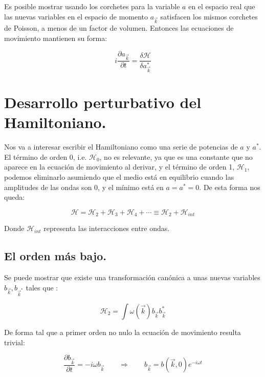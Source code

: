 Es posible mostrar usando los corchetes para la variable $a$ en el espacio real que las nuevas variables en el espacio de momento $a_{\vec k}$ satisfacen los mismos corchetes de Poisson, a menos de un factor de volumen. Entonces las ecuaciones de movimiento mantienen su forma:

\begin{equation}
	i\frac{\partial a_{\vec k}}{\partial t} = \frac{\delta \mathcal{H}}{\delta a_{\vec k}^*}
\end{equation}

\section{Desarrollo perturbativo del Hamiltoniano.}
Nos va a interesar escribir el Hamiltoniano como una serie de potencias de $a$ y $a^*$. El término de orden 0, i.e. $\mathcal{H}_0$, no es relevante, ya que es una constante que no aparece en la ecuación de movimiento al derivar, y el término de orden 1, $\mathcal{H}_1$, podemos eliminarlo asumiendo que el medio está en equilibrio cuando las amplitudes de las ondas son 0, y el mínimo está en $a=a^*=0$. De esta forma nos queda:

\begin{equation}
	\mathcal{H} = \mathcal{H}_2 + \mathcal{H}_3 + \mathcal{H}_4 + \cdots \equiv \mathcal{H}_2 + \mathcal{H}_{int}
\end{equation}

Donde $\mathcal{H}_{int}$ representa las interacciones entre ondas. 
\subsection*{El orden más bajo.}

Se puede mostrar que existe una transformación canónica a unas nuevas variables $b_{\vec{k}},b_{\vec{k}^*}$ tales que \cite{zakharovKolmogorovSpectraTurbulence1992}:

\begin{equation}
	\mathcal{H}_2 = \int \omega(\vec k)b_{\vec k}b^*_{\vec k}
\end{equation} 

De forma tal que a primer orden no nulo la ecuación de movimiento resulta trivial:

\begin{equation}
	\frac{\partial b_{\vec{k}}}{\partial t}=-i\omega b_{\vec{k}} \qquad \Rightarrow{} \qquad b_{\vec{k}}=b(\vec k, 0)e^{-i\omega t}
\end{equation}

